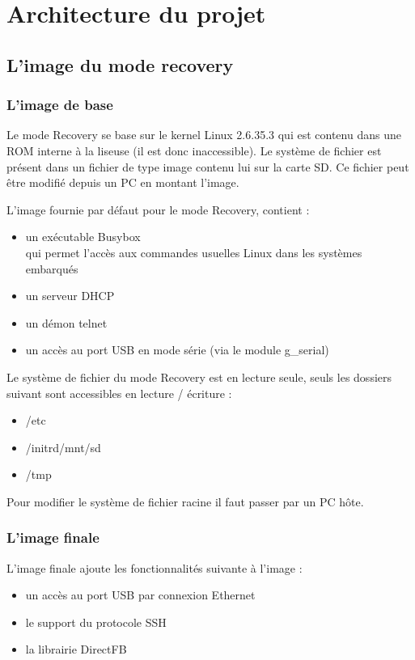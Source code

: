 \chapter{Architecture du projet}

\section{L'image du mode recovery}

\subsection{L'image de base}
Le mode Recovery se base sur le kernel Linux 2.6.35.3 qui est contenu dans une ROM interne à la liseuse (il est donc inaccessible). Le système de fichier est présent dans un fichier de type image contenu lui sur la carte SD. Ce fichier peut être modifié depuis un PC en montant l'image.

L'image fournie par défaut pour le mode Recovery, contient : 
\begin{itemize}
	\item un exécutable Busybox \\
		qui permet l'accès aux commandes usuelles Linux dans les systèmes embarqués
	\item un serveur DHCP
	\item un démon telnet
	\item un accès au port USB en mode série (via le module g_serial)
\end{itemize}


Le système de fichier du mode Recovery est en lecture seule, seuls les dossiers suivant sont accessibles en lecture / écriture : 
\begin{itemize}
	\item /etc
	\item /initrd/mnt/sd
	\item /tmp
\end{itemize}

Pour modifier le système de fichier racine il faut passer par un PC hôte.

\subsection{L'image finale}

L'image finale ajoute les fonctionnalités suivante à l'image : 
	\begin{itemize}
		\item un accès au port USB par connexion Ethernet
		\item le support du protocole SSH
		\item la librairie DirectFB
	\end{itemize}

